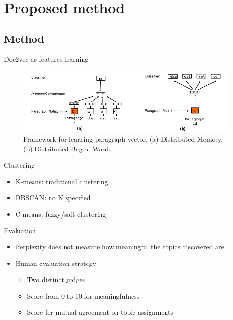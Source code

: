\documentclass{beamer}
\begin{document}
\section{Proposed method}
\subsection{Method}
\begin{frame}{Doc2vec as features learning \parencite{le2014distributed}}
	\begin{figure}
		\centering
		\includegraphics[scale=0.35]{doc2vec_hor}
		\caption{Framework for learning paragraph vector, (a) Distributed Memory, (b) Distributed Bag of Words}
		\label{fig:doc2vec}
	\end{figure}
\end{frame}

\begin{frame}{Clustering}
	\begin{itemize}
		\item K-means: traditional clustering 
		\item DBSCAN: no K specified
		\item C-means: fuzzy/soft clustering
	\end{itemize}
\end{frame}

\begin{frame}{Evaluation}
	\begin{itemize}
		\item Perplexity does not measure how \alert{meaningful} the topics discovered are
		\item Human evaluation strategy \parencite{zhao2011comparing}
		\begin{itemize}
			\item Two distinct judges
			\item Score from 0 to 10 for meaningfulness
			\item Score for mutual agreement on topic assignments
		\end{itemize}
	\end{itemize}
\end{frame}
\end{document}
